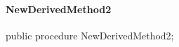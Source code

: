 \documentclass{report}
\newif\ifpdf
\begin{document}
\paragraph*{NewDerivedMethod2}\hspace*{\fill}

\label{ok_inherited_members.TNewDerived-NewDerivedMethod2}
\begin{list}{}{
\setlength{\itemindent}{0cm}
\setlength{\listparindent}{0cm}
\setlength{\leftmargin}{\evensidemargin}
\addtolength{\leftmargin}{\tmplength}
\settowidth{\labelsep}{X}
\addtolength{\leftmargin}{\labelsep}
\setlength{\labelwidth}{\tmplength}
}
\item[\textbf{Declaration}\hfill]
\ifpdf
\begin{flushleft}
\fi
\begin{ttfamily}
public procedure NewDerivedMethod2;\end{ttfamily}

\ifpdf
\end{flushleft}
\fi

\end{list}
\end{document}
